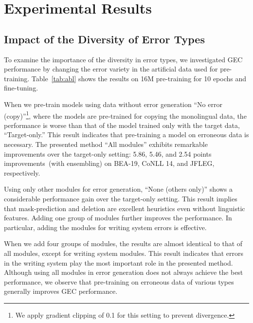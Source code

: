 \documentclass[11pt]{article}
\begin{document}
\section{Experimental Results}

\subsection{Impact of the Diversity of Error Types}

To examine the importance of the diversity in error types, we investigated GEC performance by changing the error variety in the artificial data used for pre-training.
Table~\ref{tab:abl} shows the results on 16M pre-training for 10 epochs and fine-tuning.

When we pre-train models using data without error generation ``No error (copy)''\footnote{
	We apply gradient clipping of 0.1 for this setting to prevent divergence.},
where the models are pre-trained for copying the monolingual data, the performance is worse than that of the model trained only with the target data, ``Target-only.''
This result indicates that pre-training a model on erroneous data is necessary.
The presented method ``All modules'' exhibits remarkable improvements over the target-only setting: 5.86, 5.46, and 2.54 points improvements~(with ensembling) on BEA-19, CoNLL 14, and JFLEG, respectively.

Using only other modules for error generation, ``None (others only)''  shows a considerable performance gain over the target-only setting.
This result implies that mask-prediction and deletion are excellent heuristics even without linguistic features.
Adding one group of modules further improves the performance.
In particular, adding the modules for writing system errors is effective.

When we add four groups of modules, the results are almost identical to that of all modules, except for writing system modules.
This result indicates that errors in the writing system play the most important role in the presented method.
Although using all modules in error generation does not always achieve the best performance, we observe that pre-training on erroneous data of various types generally improves GEC performance.
\end{document}
